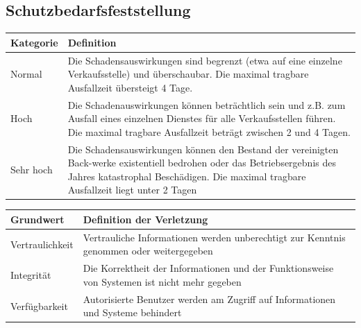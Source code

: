 \subsection{Schutzbedarfsfeststellung}
\label{subsec:schutzbedarfsfeststellung}
\begin{minipage}{\textwidth}
\begin{center}
\begin{tabular}{lp{14cm}}
\toprule
Kategorie & Definition \\
\midrule
Normal & Die Schadensauswirkungen sind begrenzt (etwa auf eine einzelne Verkaufsstelle) und überschaubar. \newline Die maximal tragbare Ausfallzeit übersteigt 4 Tage.\\[0.3cm]
Hoch & Die Schadenauswirkungen können beträchtlich sein und z.B. zum Ausfall eines einzelnen Dienstes für alle Verkaufsstellen führen. \newline Die maximal tragbare Ausfallzeit beträgt zwischen 2 und 4 Tagen. \\[0.3cm]
Sehr hoch & Die Schadensauswirkungen können den Bestand der vereinigten Back-werke existentiell bedrohen oder das Betriebsergebnis des Jahres katastrophal Beschädigen. \newline Die maximal tragbare Ausfallzeit liegt unter 2 Tagen \\
\bottomrule
\end{tabular}
\end{center}
\end{minipage}
\bigskip

\begin{minipage}{\textwidth}
\begin{center}
\begin{tabular}{lp{14cm}}
\toprule
Grundwert & Definition der Verletzung \\
\midrule
Vertraulichkeit & Vertrauliche Informationen werden unberechtigt zur Kenntnis genommen oder weitergegeben \\
Integrität & Die Korrektheit der Informationen und der Funktionsweise von Systemen ist nicht mehr gegeben \\
Verfügbarkeit & Autorisierte Benutzer werden am Zugriff auf Informationen und Systeme behindert \\
\bottomrule
\end{tabular}
\end{center}
\end{minipage}

